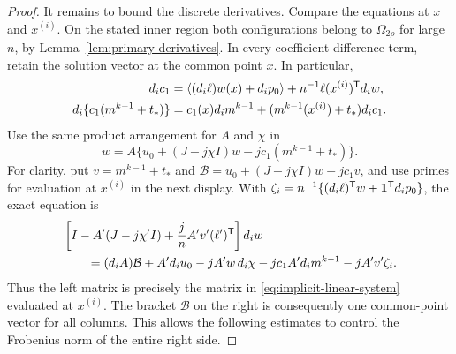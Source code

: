 \begin{proof}
It remains to bound the discrete derivatives. Compare the equations at
$x$ and $x^{(i)}$. On the stated inner region both configurations belong
to $\Omega_{2\rho}$ for large $n$, by
Lemma~\ref{lem:primary-derivatives}. In every coefficient-difference term,
retain the solution vector at the common point $x$.  In particular,
\begin{align*}
 d_i c_1
 &=\langle (d_i\ell)w(x)+d_i p_0\rangle
             +n^{-1}\ell(x^{(i)})^{\mathsf T}d_iw,\\
 d_i\{c_1(m^{k-1}+t_*)\}
 &=c_1(x)d_i m^{k-1}
               +(m^{k-1}(x^{(i)})+t_*)d_ic_1.
\end{align*}
Use the same product arrangement for $A$ and $\chi$ in
\[
 w=A\{u_0+(J-j\chi I)w-jc_1(m^{k-1}+t_*)\}.
\]
For clarity, put $v=m^{k-1}+t_*$ and
$\mathcal B=u_0+(J-j\chi I)w-jc_1v$, and use primes for evaluation at
$x^{(i)}$ in the next display.  With
$\zeta_i=n^{-1}\{(d_i\ell)^{\mathsf T}w+\mathbf 1^{\mathsf T}d_ip_0\}$,
the exact equation is
\begin{align}
 &\left[I-A'(J-j\chi'I)+\frac jn A'v'(\ell')^{\mathsf T}\right]d_iw
 \notag\\
 &\qquad=(d_iA)\mathcal B+A'd_iu_0
       -jA'w\,d_i\chi-jc_1A'd_im^{k-1}-jA'v'\zeta_i.
 \label{eq:implicit-flip-system}
\end{align}
Thus the left matrix is precisely the matrix in
\eqref{eq:implicit-linear-system} evaluated at $x^{(i)}$. The bracket
$\mathcal B$ on the right is consequently one common-point
vector for all columns. This allows the following estimates to control
the Frobenius norm of the entire right side.


\end{proof}

